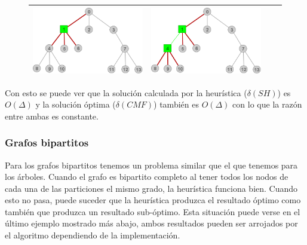 \begin{figure}[H]
\begin{center}
\begin{tabular}{|c||c||c||c|}
			\includegraphics[scale = 0.2]{img/ej3/constructiva_golosa/extremetree_st01.png} & 
			\includegraphics[scale = 0.2]{img/ej3/constructiva_golosa/extremetree_st02.png} \\
		\hline
		\end{tabular}
	\end{center}
	\end{figure}
	
Con esto se puede ver que la soluci\'on calculada por la heur\'istica ($\delta(SH)$) es $O(\Delta)$ 
y la soluci\'on \'optima ($\delta(CMF)$) tambi\'en es $O(\Delta)$ con lo que la raz\'on entre ambas 
es constante.
			
\subsubsection{Grafos bipartitos}
\label{subsub:bipartitos}
	Para los grafos bipartitos tenemos un problema similar que el que tenemos para los \'arboles.
	Cuando el grafo es bipartito completo al tener todos los nodos de cada una de las particiones
	el mismo grado, la heur\'istica funciona bien. Cuando esto no pasa, puede suceder que la 
	heur\'istica produzca el resultado \'optimo como tambi\'en que produzca un resultado sub-\'optimo.
	Esta situaci\'on puede verse en el \'ultimo ejemplo mostrado m\'as abajo, ambos resultados pueden
	ser arrojados por el algoritmo dependiendo de la implementaci\'on. 
	

